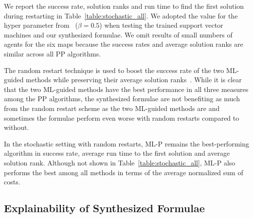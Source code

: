 We report the success rate, solution ranks and run time to find the first solution during restarting in Table~\ref{table:stochastic_all}. We adopted the value for the hyper parameter from~\citet{zhang2022learning} ($ \beta = 0.5 $) when testing the trained support vector machines and our synthesized formulae. We omit results of small numbers of agents for the six maps because the success rates and average solution ranks are similar across all PP algorithms.

The random restart technique is used to boost the success rate of the two ML-guided methods while preserving their average solution ranks~\citep{zhang2022learning}. While it is clear that the two ML-guided methods have the best performance in all three measures among the PP algorithms, the synthesized formulae are not benefiting as much from the random restart scheme as the two ML-guided methods are and sometimes the formulae perform even worse with random restarts compared to without.

In the stochastic setting with random restarts, ML-P remains the best-performing algorithm in success rate, average run time to the first solution and average solution rank. Although not shown in Table~\ref{table:stochastic_all}, ML-P also performs the best among all methods in terms of the average normalized sum of costs.

\subsection{Explainability of Synthesized Formulae}
\label{sec:explain}

